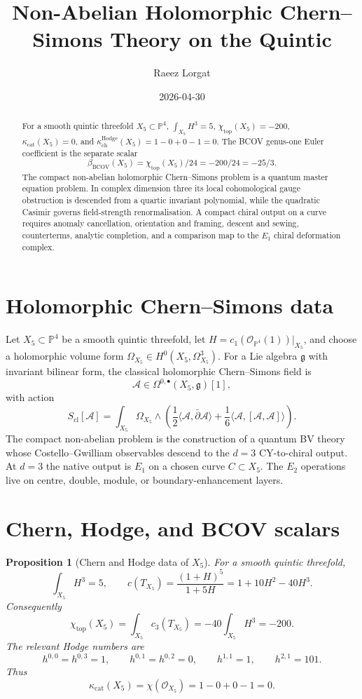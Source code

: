 \documentclass[11pt]{amsart}
\title[Non-Abelian hCS on the Quintic]{Non-Abelian Holomorphic Chern--Simons Theory on the Quintic}
\author{Raeez Lorgat}
\date{2026-04-30}
\newtheorem{proposition}[theorem]{Proposition}
\providecommand{\kchHodge}{\kappa_{\mathrm{ch}}^{\mathrm{Hodge}}}
\providecommand{\kcat}{\kappa_{\mathrm{cat}}}
\providecommand{\bBCOV}{\beta_{\mathrm{BCOV}}}
\providecommand{\fg}{\mathfrak{g}}
\providecommand{\cA}{\mathcal{A}}
\providecommand{\cO}{\mathcal{O}}
\providecommand{\PP}{\mathbb{P}}
\begin{document}
\begin{abstract}
For a smooth quintic threefold $X_5\subset\PP^4$,
$\int_{X_5}H^3=5$, $\chi_{\mathrm{top}}(X_5)=-200$,
$\kcat(X_5)=0$, and
$\kchHodge(X_5)=1-0+0-1=0$. The BCOV genus-one Euler coefficient is
the separate scalar
\[
  \bBCOV(X_5)=\chi_{\mathrm{top}}(X_5)/24=-200/24=-25/3.
\]
The compact non-abelian holomorphic Chern--Simons problem is a quantum
master equation problem. In complex dimension three its local
cohomological gauge obstruction is descended from a quartic invariant
polynomial, while the quadratic Casimir governs field-strength
renormalisation. A compact chiral output on a curve requires anomaly
cancellation, orientation and framing, descent and sewing, counterterms,
analytic completion, and a comparison map to the $E_1$ chiral
deformation complex.
\end{abstract}

\maketitle

\section*{Holomorphic Chern--Simons data}
\label{sec:hcs-quintic-nonabelian}

Let $X_5 \subset \PP^4$ be a smooth quintic threefold,
let $H=c_1(\cO_{\PP^4}(1))|_{X_5}$, and choose a holomorphic volume
form $\Omega_{X_5}\in H^0(X_5,\Omega^3_{X_5})$. For a Lie algebra
$\fg$ with invariant bilinear form, the classical holomorphic
Chern--Simons field is
\[
  \cA \in \Omega^{0,\bullet}(X_5,\fg)[1],
\]
with action
\[
S_{\mathrm{cl}}[\cA]
 =
\int_{X_5}\Omega_{X_5}\wedge
\left(
  \frac{1}{2}\langle \cA,\bar\partial \cA\rangle
  +\frac{1}{6}\langle \cA,[\cA,\cA]\rangle
\right).
\]
The compact non-abelian problem is the construction of a quantum BV
theory whose Costello--Gwilliam observables descend to the
$d=3$ CY-to-chiral output. At $d=3$ the native output is $E_1$ on a
chosen curve $C\subset X_5$. The $E_2$ operations live on centre,
double, module, or boundary-enhancement layers.

\section*{Chern, Hodge, and BCOV scalars}
\label{sec:hcs-quintic-scalars}

\begin{proposition}[Chern and Hodge data of $X_5$]
\label{prop:hcs-quintic-data}
For a smooth quintic threefold,
\[
  \int_{X_5}H^3=5,\qquad
  c(T_{X_5})=\frac{(1+H)^5}{1+5H}
  =1+10H^2-40H^3.
\]
Consequently
\[
  \chi_{\mathrm{top}}(X_5)=\int_{X_5}c_3(T_{X_5})
  =-40\int_{X_5}H^3=-200.
\]
The relevant Hodge numbers are
\[
  h^{0,0}=h^{0,3}=1,\qquad h^{0,1}=h^{0,2}=0,\qquad
  h^{1,1}=1,\qquad h^{2,1}=101.
\]
Thus
\[
  \kcat(X_5)=\chi(\cO_{X_5})=1-0+0-1=0.
\]
\end{proposition}
\end{document}
